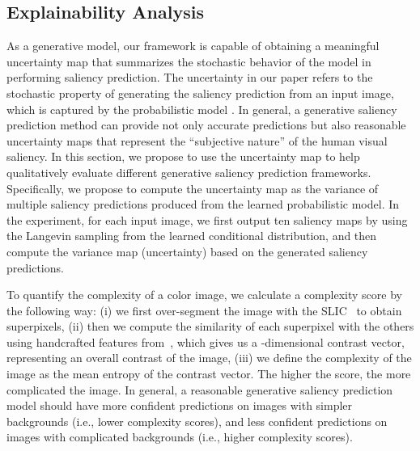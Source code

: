 \documentclass{article}
\begin{document}
\subsection{Explainability Analysis}














As a generative model, our framework is capable of obtaining a meaningful uncertainty map that summarizes the stochastic behavior of the model in performing saliency prediction. The uncertainty in our paper refers to the stochastic property of generating the saliency prediction from an input image, which is captured by the probabilistic model .
In general, a generative saliency prediction method can provide not only accurate predictions but also reasonable uncertainty maps that  represent the “subjective nature” of the human visual saliency. In this section, we propose to use the uncertainty map to help qualitatively evaluate different generative saliency prediction frameworks. Specifically, we propose to compute the uncertainty map as the variance of multiple saliency predictions produced from the learned probabilistic model. In the experiment, for each input image, we first output ten saliency maps by using the Langevin sampling from the learned conditional distribution, and then compute the variance map (uncertainty) based on the generated saliency predictions.


To quantify the complexity of a color image, we calculate a complexity score by the following way: (i) we first over-segment the image with the SLIC~\cite{slic} to obtain  superpixels, (ii) then we compute the similarity of each superpixel with the others using handcrafted features from~\cite{rbd_sal}, which gives us a -dimensional contrast vector, representing an overall contrast of the image, (iii) we define the complexity of the image as the mean entropy of the contrast vector. The higher the score, the more complicated the image. In general, a reasonable generative saliency prediction model should have more confident predictions on images with simpler backgrounds (i.e., lower complexity scores), and less confident predictions on images with complicated backgrounds (i.e., higher complexity scores). 
\end{document}
